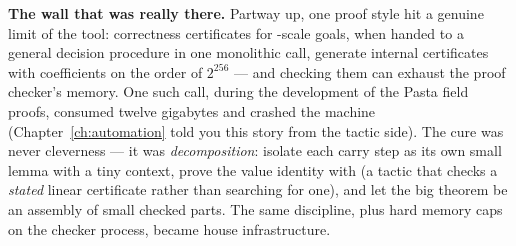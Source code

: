 \textbf{The wall that was really there.} Partway up, one proof style hit a
genuine limit of the tool: correctness certificates for -scale
goals, when handed to a general decision procedure in one monolithic call,
generate internal certificates with coefficients on the order of $2^{256}$
--- and checking them can exhaust the proof checker's memory. One such call,
during the development of the Pasta field proofs, consumed twelve gigabytes
and crashed the machine (Chapter~\ref{ch:automation} told you this story
from the tactic side). The cure was never cleverness --- it was
\emph{decomposition}: isolate each carry step as its own small lemma with a
tiny context, prove the value identity with 
(a tactic that checks a \emph{stated} linear certificate rather than
searching for one), and let the big theorem be an assembly of small
checked parts. The same discipline, plus hard memory caps on the checker
process, became house infrastructure.

